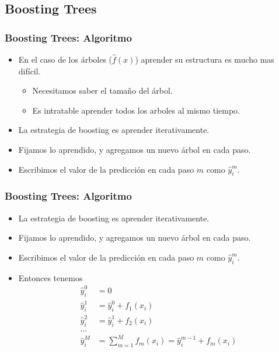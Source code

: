 \documentclass[
  shownotes,
  xcolor={svgnames},
  hyperref={colorlinks,citecolor=DarkBlue,linkcolor=DarkRed,urlcolor=DarkBlue}
  , aspectratio=169]{beamer}
\begin{document}
\subsection{Boosting Trees}
\begin{frame}[fragile]
\frametitle{Boosting Trees: Algoritmo}

\begin{itemize}
\item En el caso de los árboles ($\hat{f}(x)$) aprender su estructura es mucho mas difícil. 
\medskip
\begin{itemize}
  \item Necesitamos saber el tamaño del árbol.
  \medskip 
  \item Es intratable aprender todos los arboles al mismo tiempo.
  \medskip
\end{itemize}
  \item La estrategia de boosting es aprender iterativamente.
  \medskip 
  \item Fijamos lo aprendido, y agregamos un nuevo árbol en cada paso.
  \medskip
  \item Escribimos el valor de la predicción en cada paso $m$ como  $\hat{y}_i^{m}$. 
\end{itemize}
\end{frame}
\begin{frame}[fragile]
\frametitle{Boosting Trees: Algoritmo}
\begin{itemize}
\item La estrategia de boosting es aprender iterativamente.
\medskip
\item Fijamos lo aprendido, y agregamos un nuevo árbol en cada paso.
\medskip
\item Escribimos el valor de la predicción en cada paso $m$ como  $\hat{y}_i^{m}$. 
\medskip
\item Entonces tenemos
\begin{align}
\hat{y}_i^{0} &=0 \\ \nonumber
\hat{y}_i^{1} &= \hat{y}_i^{0} + f_1(x_i) \\ \nonumber
\hat{y}_i^{2} &= \hat{y}_i^{1} + f_2(x_i) \\ \nonumber
\dots \\ \nonumber
\hat{y}_i^{M} &= \sum_{m=1}^M f_m(x_i) = \hat{y}_i^{m-1} + f_m(x_i) \\ \nonumber
\end{align}
\end{itemize}


 \end{frame}
\end{document}
